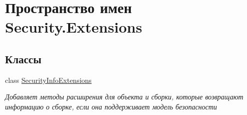 \hypertarget{namespace_security_1_1_extensions}{}\section{Пространство имен Security.\+Extensions}
\label{namespace_security_1_1_extensions}
\subsection*{Классы}
\begin{DoxyCompactItemize}
\item 
class \hyperlink{class_security_1_1_extensions_1_1_security_info_extensions}{Security\+Info\+Extensions}
\begin{DoxyCompactList}\small\item\em Добавляет методы расширения для объекта и сборки, которые возвращают информацию о сборке, если она поддерживает модель безопасности \end{DoxyCompactList}\end{DoxyCompactItemize}
